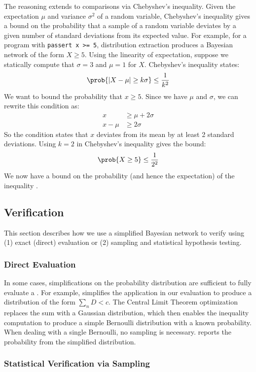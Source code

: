The reasoning extends to comparisons via Chebyshev's inequality.
Given the expectation $\mu$ and variance $\sigma^2$ of a random variable,
Chebyshev's inequality
gives a bound on the probability that a sample of a random variable deviates
by a given number of standard deviations from its expected value.
For example, for a program with
\lstinline{passert x >= 5}, distribution extraction produces a Bayesian
network of the form $X \ge 5$.
Using the linearity of expectation, suppose we statically compute that $\sigma = 3$ and $\mu = 1$ for
$X$. Chebyshev's inequality states:
%
$$\prob{|X - \mu| \ge k\sigma} \le \frac{1}{k^2}$$
%
We want to bound the probability that $x \ge 5$. Since we have $\mu$ and $\sigma$, we can rewrite this condition as:
%
\begin{align*}
x &\ge \mu + 2\sigma \\
x - \mu &\ge 2\sigma
\end{align*}
%
So the \passert condition states that $x$ deviates from its mean by at least 2
standard deviations. Using $k=2$ in Chebyshev's inequality gives the bound:
%
$$\prob{X \ge 5} \le \frac{1}{2^2}$$
%
We now have a bound on the probability (and hence the expectation) of the
inequality .


\subsection{Verification}
\label{passert:sec:verification}
This section describes how we use a simplified Bayesian network to verify
\passerts using (1) exact (direct) evaluation or (2) sampling and
statistical hypothesis testing.

\subsubsection{Direct Evaluation}
\label{passert:sec:exact}
In some cases, simplifications on the probability distribution are
sufficient to fully evaluate a \passert. For example, \tool simplifies
the  application in our evaluation to produce a
distribution of the form $\sum_n D < c$. The Central Limit Theorem
optimization replaces the sum with a Gaussian distribution, which then
enables the inequality computation to produce a simple Bernoulli
distribution with a known probability.  When dealing with a single
Bernoulli, no sampling is necessary. \tool reports the probability
from the simplified distribution.

\subsubsection{Statistical Verification via Sampling}
\label{passert:sec:sample}

